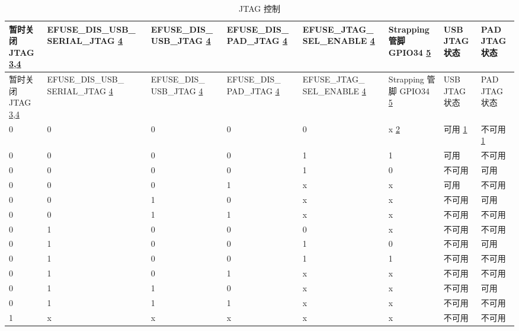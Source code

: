 \begin{longtable}{ | p{1.4cm} | p{2.1cm} | p{1.9cm} | p{1.9cm} | p{2.1cm} | p{1.4cm} | p{1.7cm} | p{2.0cm} | }
\caption{JTAG 控制} \label{tab:riscvcpu-jtag-control}\\
\hline\rowcolor{lightgray}
暂时关闭 JTAG \hyperref[JTAG footnote: 3]{3},\hyperref[JTAG footnote: 4]{4} & EFUSE\_DIS\_USB\_ SERIAL\_JTAG \hyperref[JTAG footnote: 4]{4} & EFUSE\_DIS\_ USB\_JTAG \hyperref[JTAG footnote: 4]{4} & EFUSE\_DIS\_ PAD\_JTAG \hyperref[JTAG footnote: 4]{4} & EFUSE\_JTAG\_ SEL\_ENABLE \hyperref[JTAG footnote: 4]{4} & Strapping 管脚 GPIO34 \hyperref[JTAG footnote: 5]{5} & USB JTAG 状态 & PAD JTAG 状态 \\ \hline
\endfirsthead
\hline
\rowcolor{lightgray}
暂时关闭 JTAG \hyperref[JTAG footnote: 3]{3},\hyperref[JTAG footnote: 4]{4} & EFUSE\_DIS\_USB\_ SERIAL\_JTAG \hyperref[JTAG footnote: 4]{4} & EFUSE\_DIS\_ USB\_JTAG \hyperref[JTAG footnote: 4]{4} & EFUSE\_DIS\_ PAD\_JTAG \hyperref[JTAG footnote: 4]{4} & EFUSE\_JTAG\_ SEL\_ENABLE \hyperref[JTAG footnote: 4]{4} & Strapping 管脚 GPIO34 \hyperref[JTAG footnote: 5]{5} & USB JTAG 状态 & PAD JTAG 状态 \\ \hline
\hline
\endhead
\endfoot

0 & 0 & 0 & 0 & 0 & x \hyperref[JTAG footnote: 2]{2}	& 可用	 \hyperref[JTAG footnote: 1]{1}  &     不可用  \hyperref[JTAG footnote: 1]{1}  \\\hline
0 & 0 & 0 & 0 & 1 & 1	& 可用	  &     不可用   \\\hline
0 & 0 & 0 & 0 & 1 & 0	& 不可用 & 	可用 \\\hline
0 & 0 & 0 & 1 & x & x	& 可用   & 	不可用 \\\hline
0 & 0 & 1 & 0 & x & x	& 不可用 & 	可用 \\\hline
0 & 0 & 1 & 1 & x & x	& 不可用 & 	不可用 \\\hline
0 & 1 & 0 & 0 & 0 & x	& 不可用 & 	不可用 \\\hline
0 & 1 & 0 & 0 & 1 & 0	& 不可用 & 	可用 \\\hline
0 & 1 & 0 & 0 & 1 & 1	& 不可用 & 	不可用 \\\hline
0 & 1 & 0 & 1 & x & x	& 不可用 & 	不可用 \\\hline
0 & 1 & 1 & 0 & x & x	& 不可用 & 	可用 \\\hline
0 & 1 & 1 & 1 & x & x	& 不可用 & 	不可用 \\\hline
1 & x & x & x & x & x	& 不可用 & 	不可用 \\\hline

\end{longtable}

